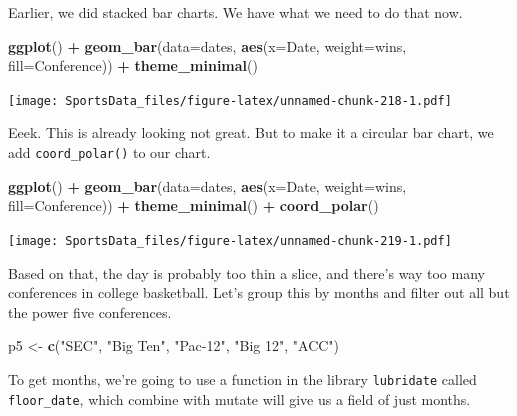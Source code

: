\documentclass[]{book}
\newenvironment{Shaded}{\begin{snugshade}}{\end{snugshade}}
\newcommand{\DataTypeTok}[1]{\textcolor[rgb]{0.13,0.29,0.53}{#1}}
\newcommand{\KeywordTok}[1]{\textcolor[rgb]{0.13,0.29,0.53}{\textbf{#1}}}
\newcommand{\NormalTok}[1]{#1}
\newcommand{\OperatorTok}[1]{\textcolor[rgb]{0.81,0.36,0.00}{\textbf{#1}}}
\newcommand{\StringTok}[1]{\textcolor[rgb]{0.31,0.60,0.02}{#1}}
\begin{document}
Earlier, we did stacked bar charts. We have what we need to do that now.

\begin{Shaded}
\begin{Highlighting}[]
\KeywordTok{ggplot}\NormalTok{() }\OperatorTok{+}\StringTok{ }\KeywordTok{geom_bar}\NormalTok{(}\DataTypeTok{data=}\NormalTok{dates, }\KeywordTok{aes}\NormalTok{(}\DataTypeTok{x=}\NormalTok{Date, }\DataTypeTok{weight=}\NormalTok{wins, }\DataTypeTok{fill=}\NormalTok{Conference)) }\OperatorTok{+}\StringTok{ }\KeywordTok{theme_minimal}\NormalTok{()}
\end{Highlighting}
\end{Shaded}

\texttt{[image: SportsData\_files/figure-latex/unnamed-chunk-218-1.pdf]}

Eeek. This is already looking not great. But to make it a circular bar chart, we add \texttt{coord\_polar()} to our chart.

\begin{Shaded}
\begin{Highlighting}[]
\KeywordTok{ggplot}\NormalTok{() }\OperatorTok{+}\StringTok{ }\KeywordTok{geom_bar}\NormalTok{(}\DataTypeTok{data=}\NormalTok{dates, }\KeywordTok{aes}\NormalTok{(}\DataTypeTok{x=}\NormalTok{Date, }\DataTypeTok{weight=}\NormalTok{wins, }\DataTypeTok{fill=}\NormalTok{Conference)) }\OperatorTok{+}\StringTok{ }\KeywordTok{theme_minimal}\NormalTok{() }\OperatorTok{+}\StringTok{ }\KeywordTok{coord_polar}\NormalTok{()}
\end{Highlighting}
\end{Shaded}

\texttt{[image: SportsData\_files/figure-latex/unnamed-chunk-219-1.pdf]}

Based on that, the day is probably too thin a slice, and there's way too many conferences in college basketball. Let's group this by months and filter out all but the power five conferences.

\begin{Shaded}
\begin{Highlighting}[]
\NormalTok{p5 <-}\StringTok{ }\KeywordTok{c}\NormalTok{(}\StringTok{"SEC"}\NormalTok{, }\StringTok{"Big Ten"}\NormalTok{, }\StringTok{"Pac-12"}\NormalTok{, }\StringTok{"Big 12"}\NormalTok{, }\StringTok{"ACC"}\NormalTok{)}
\end{Highlighting}
\end{Shaded}

To get months, we're going to use a function in the library \texttt{lubridate} called \texttt{floor\_date}, which combine with mutate will give us a field of just months.
\end{document}

